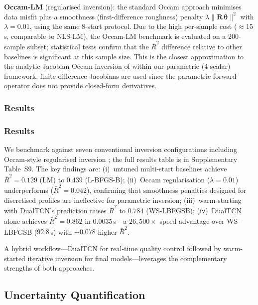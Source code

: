 \documentclass[journal]{IEEEtran}
\begin{document}
\textbf{Occam-LM} (regularised inversion): the standard Occam
approach \citep{constable1987occam} minimises data misfit plus a
smoothness (first-difference roughness) penalty
$\lambda \|\mathbf{R}\,\boldsymbol{\theta}\|^2$ with
$\lambda = 0.01$, using the same 8-start protocol.  Due to the
high per-sample cost ($\approx$15\,s, comparable to NLS-LM), the
Occam-LM benchmark is evaluated on a 200-sample subset; statistical
tests confirm that the $\bar{R}^2$ difference relative to other
baselines is significant at this sample size. This is the closest
approximation to the analytic-Jacobian Occam inversion of
\citet{key2009} within our parametric (4-scalar) framework;
finite-difference Jacobians are used since the parametric forward
operator does not provide closed-form derivatives.

\subsubsection{Results}


\subsubsection{Results}

We benchmark against seven conventional inversion configurations
including Occam-style regularised inversion
\citep{constable1987occam}; the full results table is in
Supplementary Table~S9.  The key findings are:
(i)~untuned multi-start baselines achieve $\bar{R}^2 = 0.129$
(LM) to $0.439$ (L-BFGS-B);
(ii)~Occam regularisation ($\lambda = 0.01$) underperforms
($\bar{R}^2 = 0.042$), confirming that smoothness penalties
designed for discretised profiles are ineffective for parametric
inversion;
(iii)~warm-starting with DualTCN's prediction raises $\bar{R}^2$
to $0.784$ (WS-LBFGSB);
(iv)~DualTCN alone achieves $\bar{R}^2 = 0.862$ in
$0.0035$\,s---a $26{,}500\times$ speed advantage over WS-LBFGSB
($92.8$\,s) with $+0.078$ higher $\bar{R}^2$.

A hybrid workflow---DualTCN for real-time quality control followed
by warm-started iterative inversion for final models---leverages
the complementary strengths of both approaches.

\subsection{Uncertainty Quantification}
\label{sec:uq}
\end{document}
